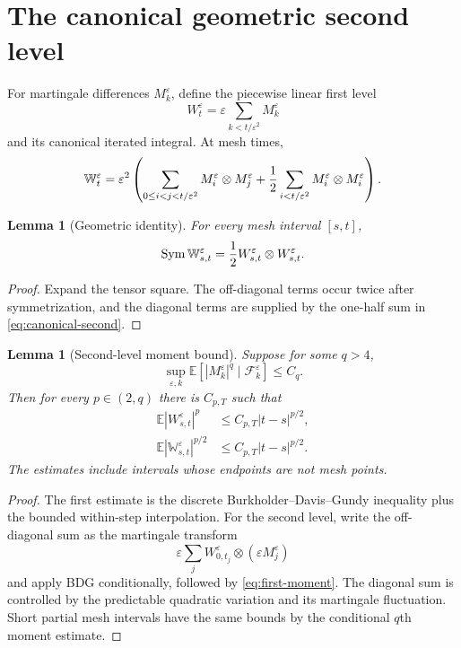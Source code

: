 \documentclass[11pt,reqno]{amsart}
\newtheorem{lemma}[theorem]{Lemma}
\theoremstyle{definition}
\newcommand{\E}{\mathbb E}
\newcommand{\F}{\mathcal F}
\newcommand{\abs}[1]{\left\lvert#1\right\rvert}
\begin{document}
\section{The canonical geometric second level}

For martingale differences $M_k^\varepsilon$, define the piecewise linear
first level
\[
 W_t^\varepsilon=\varepsilon\sum_{k<t/\varepsilon^2}M_k^\varepsilon
\]
and its canonical iterated integral.  At mesh times,
\begin{equation}\label{eq:canonical-second}
 \mathbb W_t^\varepsilon=\varepsilon^2\left(
 \sum_{0\le i<j<t/\varepsilon^2}M_i^\varepsilon\otimes M_j^\varepsilon
 +{1\over2}\sum_{i<t/\varepsilon^2}M_i^\varepsilon\otimes M_i^\varepsilon
 \right).
\end{equation}

\begin{lemma}[Geometric identity]\label{lem:geometric}
For every mesh interval $[s,t]$,
\[
 \operatorname{Sym}\mathbb W_{s,t}^\varepsilon
 ={1\over2}W_{s,t}^\varepsilon\otimes W_{s,t}^\varepsilon.
\]
\end{lemma}

\begin{proof}
Expand the tensor square.  The off-diagonal terms occur twice after
symmetrization, and the diagonal terms are supplied by the one-half sum in
\eqref{eq:canonical-second}.
\end{proof}

\begin{lemma}[Second-level moment bound]\label{lem:BDG2}
Suppose for some $q>4$,
\[
 \sup_{\varepsilon,k}\E[\abs{M_k^\varepsilon}^q\mid\F_k^\varepsilon]
 \le C_q.
\]
Then for every $p\in(2,q)$ there is $C_{p,T}$ such that
\begin{align}
 \E\abs{W_{s,t}^\varepsilon}^{p}
 &\le C_{p,T}\abs{t-s}^{p/2},\label{eq:first-moment}\\
 \E\abs{\mathbb W_{s,t}^\varepsilon}^{p/2}
 &\le C_{p,T}\abs{t-s}^{p/2}.
 \label{eq:second-moment}
\end{align}
The estimates include intervals whose endpoints are not mesh points.
\end{lemma}

\begin{proof}
The first estimate is the discrete Burkholder--Davis--Gundy inequality plus the
bounded within-step interpolation.  For the second level, write the off-
diagonal sum as the martingale transform
\[
 \varepsilon\sum_jW_{0,t_j}^\varepsilon\otimes
 (\varepsilon M_j^\varepsilon)
\]
and apply BDG conditionally, followed by \eqref{eq:first-moment}.  The diagonal
sum is controlled by the predictable quadratic variation and its martingale
fluctuation.  Short partial mesh intervals have the same bounds by the
conditional $q$th moment estimate.
\end{proof}
\end{document}
